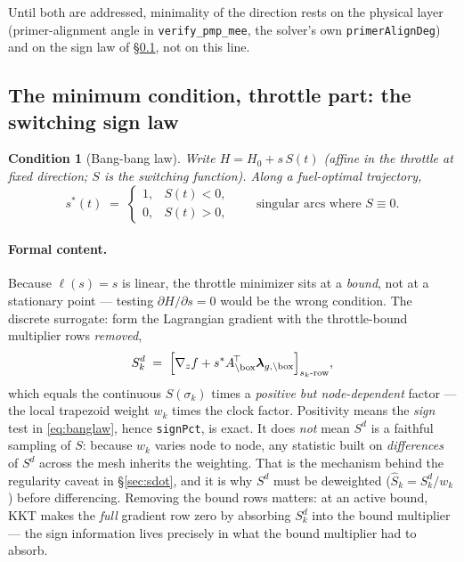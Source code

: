 \documentclass[11pt]{article}
\newcommand{\vlam}{\boldsymbol{\lambda}}
\newcommand{\Ham}{H}
\newcommand{\file}[1]{\texttt{#1}}
\newcommand{\code}[1]{\texttt{#1}}
\newtheorem{condition}{Condition}
\begin{document}
Until both are addressed, minimality of the direction rests on the physical
layer (primer-alignment angle in \file{verify\_pmp\_mee}, the solver's own
\code{primerAlignDeg}) and on the sign law of \S\ref{sec:signlaw}, not on this
line.

\subsection{The minimum condition, throttle part: the switching sign law}
\label{sec:signlaw}

\begin{condition}[Bang-bang law]
Write $\Ham = \Ham_0 + s\,S(t)$ (affine in the throttle at fixed direction;
$S$ is the \emph{switching function}). Along a fuel-optimal trajectory,
\begin{equation}
s^\ast(t) \;=\;
\begin{cases}
1, & S(t) < 0,\\
0, & S(t) > 0,
\end{cases}
\qquad\text{singular arcs where } S\equiv 0 .
\label{eq:banglaw}
\end{equation}
\end{condition}

\paragraph{Formal content.}
Because $\ell(s)=s$ is linear, the throttle minimizer sits at a \emph{bound},
not at a stationary point --- testing $\partial\Ham/\partial s = 0$ would be
the wrong condition. The discrete surrogate: form the Lagrangian gradient with
the throttle-bound multiplier rows \emph{removed},
\begin{equation}
S^d_k \;=\;
\Bigl[\nabla_z f + s^\ast A_{\setminus\mathrm{box}}^{\!\top}
\vlam_{g,\setminus\mathrm{box}}\Bigr]_{s_k\text{-row}},
\label{eq:Sd}
\end{equation}
which equals the continuous $S(\sigma_k)$ times a \emph{positive but
node-dependent} factor --- the local trapezoid weight $w_k$ times the clock
factor. Positivity means the \emph{sign} test in \eqref{eq:banglaw}, hence
\code{signPct}, is exact. It does \emph{not} mean $S^d$ is a faithful sampling
of $S$: because $w_k$ varies node to node, any statistic built on
\emph{differences} of $S^d$ across the mesh inherits the weighting. That is
the mechanism behind the regularity caveat in \S\ref{sec:sdot}, and it is why
$S^d$ must be deweighted ($\widehat S_k = S^d_k/w_k$) before differencing.
Removing the bound rows matters: at an active bound, KKT makes the \emph{full}
gradient row zero by absorbing $S^d_k$ into the bound multiplier --- the sign
information lives precisely in what the bound multiplier had to absorb.
\end{document}
